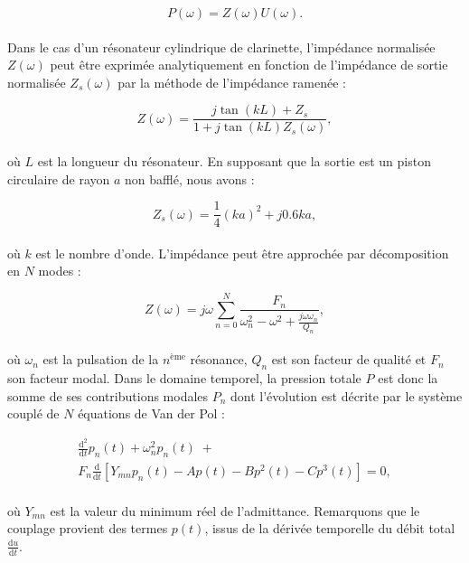 \begin{equation}
    P(\omega)=Z(\omega)U(\omega).
\end{equation}\\
Dans le cas d'un résonateur cylindrique de clarinette, l'impédance normalisée $Z(\omega)$ peut être exprimée analytiquement en fonction de l'impédance de sortie normalisée $Z_s(\omega)$ par la méthode de l'impédance ramenée :

\begin{equation}
    Z(\omega)=\frac{j\tan(kL)+Z_s}{1+j\tan(kL)Z_s(\omega)},
    \label{eq:Z_clari}
\end{equation}\\
où $L$ est la longueur du résonateur. En supposant que la sortie est un piston circulaire de rayon $a$ non bafflé, nous avons :

\begin{equation}
    Z_s(\omega) = \frac{1}{4}(ka)^2+j0.6ka,
    \label{eq:Zs}
\end{equation}\\
où $k$ est le nombre d'onde. L'impédance peut être approchée par décomposition en $N$ modes :

\begin{equation}
    Z(\omega)=j\omega\sum_{n=0}^{N}\frac{F_n}{\omega_n^2-\omega^2+\frac{j\omega\omega_n}{Q_n}},
\end{equation}\\
où $\omega_n$ est la pulsation de la $n^{\text{ème}}$ résonance, $Q_n$ est son facteur de qualité et $F_n$ son facteur modal. Dans le domaine temporel, la pression totale $P$ est donc la somme de ses contributions modales $P_n$ dont l'évolution est décrite par le système couplé de $N$ équations de Van der Pol :

\begin{multline}
    \frac{\text{d}^2}{\text{d}t}p_n(t) + \omega_n^2p_n(t) \;+\\F_n\frac{\text{d}}{\text{d}t}\left[Y_{mn}p_n(t)-Ap(t)-Bp^2(t)-Cp^3(t)\right]=0,
\label{eq:VDP}
\end{multline}\\
où $Y_{mn}$ est la valeur du minimum réel de l'admittance. Remarquons que le couplage provient des termes $p(t)$, issus de la dérivée temporelle du débit total $\frac{\text{d}u}{\text{d}t}$.

